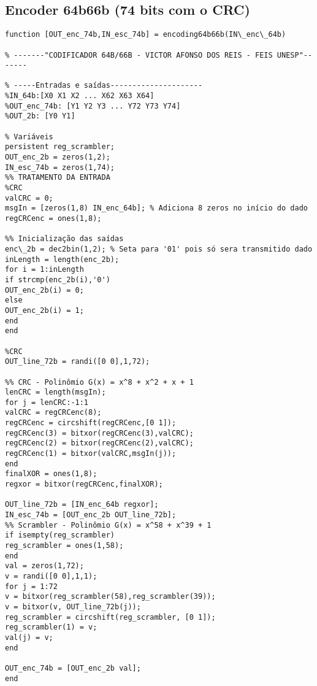 
\begin{apendicesenv}
\partapendices
\chapter{Encoder 64b66b (74 bits com o CRC)} \label{enc:64b}

\begin{lstlisting}
function [OUT_enc_74b,IN_esc_74b] = encoding64b66b(IN\_enc\_64b)

% -------"CODIFICADOR 64B/66B - VICTOR AFONSO DOS REIS - FEIS UNESP"-------

% -----Entradas e saídas---------------------
%IN_64b:[X0 X1 X2 ... X62 X63 X64]
%OUT_enc_74b: [Y1 Y2 Y3 ... Y72 Y73 Y74]
%OUT_2b: [Y0 Y1]

% Variáveis
persistent reg_scrambler;
OUT_enc_2b = zeros(1,2);
IN_esc_74b = zeros(1,74);
%% TRATAMENTO DA ENTRADA
%CRC
valCRC = 0;
msgIn = [zeros(1,8) IN_enc_64b]; % Adiciona 8 zeros no início do dado
regCRCenc = ones(1,8);

%% Inicialização das saídas
enc\_2b = dec2bin(1,2); % Seta para '01' pois só sera transmitido dado
inLength = length(enc_2b);
for i = 1:inLength
if strcmp(enc_2b(i),'0')
OUT_enc_2b(i) = 0;
else
OUT_enc_2b(i) = 1;
end
end

%CRC
OUT_line_72b = randi([0 0],1,72);

%% CRC - Polinômio G(x) = x^8 + x^2 + x + 1
lenCRC = length(msgIn);
for j = lenCRC:-1:1
valCRC = regCRCenc(8);
regCRCenc = circshift(regCRCenc,[0 1]);
regCRCenc(3) = bitxor(regCRCenc(3),valCRC);
regCRCenc(2) = bitxor(regCRCenc(2),valCRC);
regCRCenc(1) = bitxor(valCRC,msgIn(j));
end
finalXOR = ones(1,8);
regxor = bitxor(regCRCenc,finalXOR);

OUT_line_72b = [IN_enc_64b regxor];
IN_esc_74b = [OUT_enc_2b OUT_line_72b];
%% Scrambler - Polinômio G(x) = x^58 + x^39 + 1
if isempty(reg_scrambler)
reg_scrambler = ones(1,58);
end
val = zeros(1,72);
v = randi([0 0],1,1);
for j = 1:72
v = bitxor(reg_scrambler(58),reg_scrambler(39));
v = bitxor(v, OUT_line_72b(j));
reg_scrambler = circshift(reg_scrambler, [0 1]);
reg_scrambler(1) = v;
val(j) = v;
end

OUT_enc_74b = [OUT_enc_2b val];
end
\end{lstlisting}
    



\end{apendicesenv}
